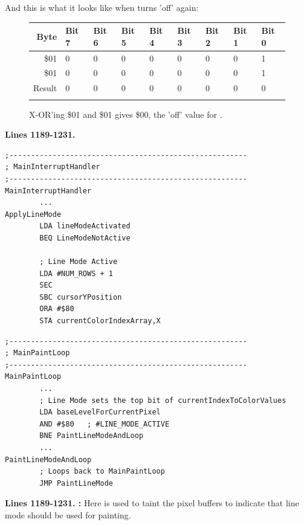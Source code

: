 And this is what it looks like when  turns  'off' again:
\begin{figure}[H]
  {
    \setlength{\tabcolsep}{3.0pt}
    \setlength\cmidrulewidth{\heavyrulewidth} %
    \begin{adjustbox}{width=7cm,center}

      \begin{tabular}{rllllllll}
        \toprule
        Byte & Bit 7 & Bit 6 & Bit 5 & Bit 4 & Bit 3 & Bit 2 & Bit 1 & Bit 0        \\
        \midrule
        \$01 & 0 & 0 & 0 & 0 & 0 & 0 & 0 & 1 \\
        \$01 & 0 & 0 & 0 & 0 & 0 & 0 & 0 & 1 \\
        \midrule
        Result & 0 & 0 & 0 & 0 & 0 & 0 & 0 & 0 \\
        \addlinespace
        \bottomrule
      \end{tabular}

    \end{adjustbox}

  }\caption*{X-OR'ing \$01 and \$01 gives \$00, the 'off' value for .}
\end{figure}
\clearpage

\textbf{Lines 1189-1231. } 
\begin{lstlisting}[caption=From \icode{MainInterruptHandler}.]
;-------------------------------------------------------
; MainInterruptHandler
;-------------------------------------------------------
MainInterruptHandler
        ...
ApplyLineMode
        LDA lineModeActivated
        BEQ LineModeNotActive

        ; Line Mode Active
        LDA #NUM_ROWS + 1
        SEC 
        SBC cursorYPosition
        ORA #$80
        STA currentColorIndexArray,X
\end{lstlisting}

\begin{lstlisting}[caption=From \icode{MainPaintLoop}.]
;-------------------------------------------------------
; MainPaintLoop
;-------------------------------------------------------
MainPaintLoop    
        ...
        ; Line Mode sets the top bit of currentIndexToColorValues
        LDA baseLevelForCurrentPixel
        AND #$80   ; #LINE_MODE_ACTIVE
        BNE PaintLineModeAndLoop
        ...
PaintLineModeAndLoop
        ; Loops back to MainPaintLoop
        JMP PaintLineMode
\end{lstlisting}
\clearpage
\textbf{Lines 1189-1231. :} Here  is used
to taint the pixel buffers to indicate that line mode should be used for painting.


